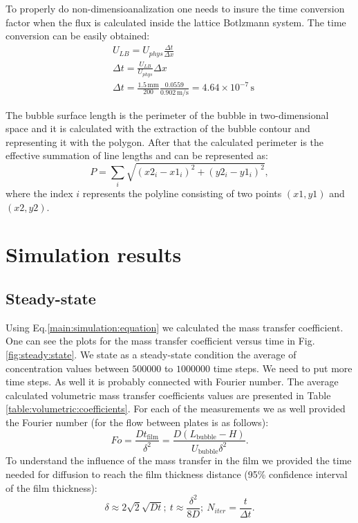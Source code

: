 \documentclass{article}
\begin{document}
To properly do
non-dimensioanalization one needs to insure the time conversion factor when the flux is calculated
inside the lattice Botlzmann system. The time conversion can be easily obtained:
\begin{equation}
\begin{aligned}
&U_{LB}=U_{phys}\frac{\Delta t}{\Delta x}\\
&\Delta t=\frac{U_{LB}}{U_{phys}}\Delta x\\
&\Delta t=\frac{1.5\,\mathrm{mm}}{200} \frac{0.0559}{0.902\,\mathrm{m/s}}=4.64\times
10^{-7}\,\mathrm{s} 
\end{aligned}
\end{equation}

The bubble surface length is the perimeter of the bubble in two-dimensional space and it is
calculated with the extraction of the bubble contour and representing it with the polygon. After
that the calculated perimeter is the effective summation of line lengths and can be represented as:
\begin{equation}
P=\sum_i{\sqrt{(x2_i-x1_i)^2+(y2_i-y1_i)^2}},
\end{equation}
where the index $i$ represents the polyline consisting of two points $(x1,y1)$ and $(x2,y2)$.

\section{Simulation results}
\subsection{Steady-state}
Using Eq.\ref{main:simulation:equation} we calculated the mass transfer coefficient. One can see
the plots for the mass transfer coefficient versus time in Fig. \ref{fig:steady:state}. We state as
a steady-state condition the average of concentration values between $500000$ to $1000000$ time
steps.{\color{red} We need to put more time steps. As well it is probably connected with Fourier
number.} The average calculated volumetric mass transfer coefficients values are presented in Table
\ref{table:volumetric:coefficients}. For each of the measurements we as well provided the Fourier
number (for the flow between plates is as follows):
\begin{equation}
Fo=\frac{D t_{\mathrm{film}}}{\delta^2}=\frac{D
(L_{\mathrm{bubble}}-H)}{U_{\mathrm{bubble}}\delta^2}.
\end{equation}
To understand the influence of the mass transfer in the film we provided the time needed for
diffusion to reach the film thickness distance (95\% confidence interval of the film thickness):
\begin{equation}
\delta\approx 2\sqrt{2}\sqrt{D t};\ t \approx \frac{\delta^2}{8 D};\ N_{iter}=\frac{t}{\Delta t}.
\end{equation}
\end{document}
